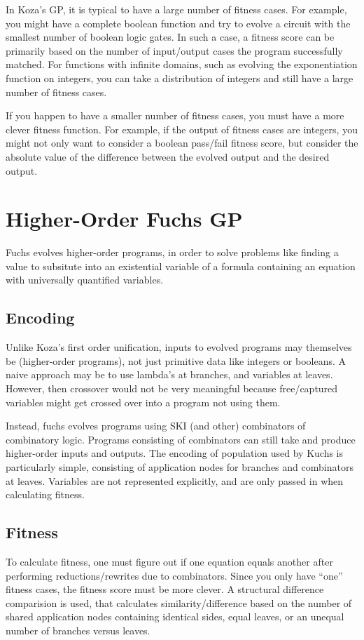 \documentclass{article}
\begin{document}
In Koza's GP, it is typical to have a large number of fitness cases.
For example, you might have a complete boolean function and try to
evolve a circuit with the smallest number of boolean logic gates. In
such a case, a fitness score can be primarily based on the number of
input/output cases the program successfully matched. For functions
with infinite domains, such as evolving the exponentiation function on
integers, you can take a distribution of integers and still have a
large number of fitness cases.

If you happen to have a smaller number of fitness cases, you must have
a more clever fitness function. For example, if the output of fitness
cases are integers, you might not only want to consider a boolean
pass/fail fitness score, but consider the absolute value of the
difference between the evolved output and the desired output.

\section{Higher-Order Fuchs GP}

Fuchs evolves higher-order programs, in order to solve problems like
finding a value to subsitute into an existential variable of a formula
containing an equation with universally quantified variables.

\subsection{Encoding}

Unlike Koza's first order unification, inputs to evolved programs may
themselves be (higher-order programs), not just primitive data like
integers or booleans. A naive approach may be to use lambda's at
branches, and variables at leaves. However, then crossover would not
be very meaningful because free/captured variables might get crossed
over into a program not using them.

Instead, fuchs evolves programs using SKI (and other) combinators of
combinatory logic. Programs consisting of combinators can still take
and produce higher-order inputs and outputs. The encoding of
population used by Kuchs is particularly simple, consisting of
application nodes for branches and combinators at leaves. Variables
are not represented explicitly, and are only passed in when
calculating fitness.

\subsection{Fitness}

To calculate fitness, one must figure out if one equation equals
another after performing reductions/rewrites due to combinators. Since
you only have ``one'' fitness cases, the fitness score must be more
clever. A structural difference comparision is used, that calculates
similarity/difference based on the number of shared application nodes
containing identical sides, equal leaves, or an unequal number of
branches versus leaves.
\end{document}
